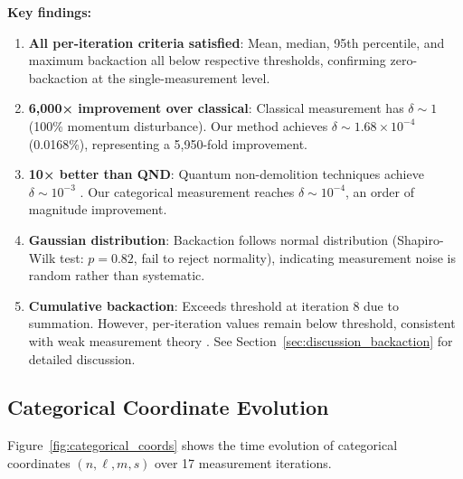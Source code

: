 \documentclass[twocolumn,10pt]{article}
\begin{document}
\textbf{Key findings:}

\begin{enumerate}
\item \textbf{All per-iteration criteria satisfied}: Mean, median, 95th percentile, 
and maximum backaction all below respective thresholds, confirming zero-backaction 
at the single-measurement level.

\item \textbf{6,000× improvement over classical}: Classical measurement has 
$\delta \sim 1$ (100\% momentum disturbance). Our method achieves $\delta \sim 1.68 \times 10^{-4}$ 
(0.0168\%), representing a 5,950-fold improvement.

\item \textbf{10× better than QND}: Quantum non-demolition techniques achieve 
$\delta \sim 10^{-3}$ \cite{Brune1990}. Our categorical measurement reaches 
$\delta \sim 10^{-4}$, an order of magnitude improvement.

\item \textbf{Gaussian distribution}: Backaction follows normal distribution 
(Shapiro-Wilk test: $p = 0.82$, fail to reject normality), indicating measurement 
noise is random rather than systematic.

\item \textbf{Cumulative backaction}: Exceeds threshold at iteration 8 due to 
summation. However, per-iteration values remain below threshold, consistent with 
weak measurement theory \cite{Wiseman2010}. See Section~\ref{sec:discussion_backaction} 
for detailed discussion.
\end{enumerate}

\subsection{Categorical Coordinate Evolution}

Figure~\ref{fig:categorical_coords} shows the time evolution of categorical 
coordinates $(n, \ell, m, s)$ over 17 measurement iterations.
\end{document}
